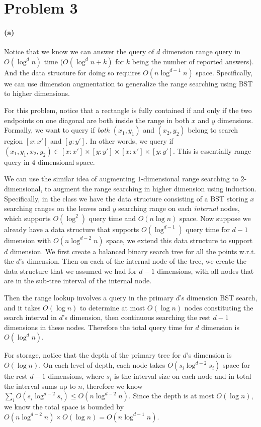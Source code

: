 \documentclass[12pt]{article}
\begin{document}
\pagebreak
\section*{Problem 3}
\paragraph{(a)} Notice that we know we can answer the query of $d$ dimension range query in $O(\log^d n)$ time ($O(\log^d n + k)$ for $k$ being the number of reported answers). And the data structure for doing so requires $O(n \log^{d-1}n)$ space. Specifically, we can use dimension augmentation to generalize the range searching using BST to higher dimensions.  

For this problem, notice that a rectangle is fully contained if and only if the two endpoints on one diagonal are both inside the range in both $x$ and $y$ dimensions. Formally, we want to query if \emph{both} $(x_1, y_1)$ and $(x_2, y_2)$ belong to search region $[x:x']$ and $[y:y']$. In other words, we query if $(x_1, y_1, x_2, y_2) \in [x:x'] \times [y:y'] \times [x:x'] \times [y:y'] $. This is essentially range query in $4$-dimensional space.

We can use the similar idea of augmenting $1$-dimensional range searching to $2$-dimensional, to augment the range searching in higher dimension using induction. Specifically, in the class we have the data structure consisting of a BST storing $x$ searching ranges on the leaves and $y$ searching range on each \emph{internal} nodes, which supports $O(\log^2)$ query time and $O(n\log n)$ space. Now suppose we already have a data structure that supports $O(\log^{d-1})$ query time for $d-1$ dimension with $O(n\log^{d-2} n)$ space, we extend this data structure to support $d$ dimension. We first create a balanced binary search tree for all the points w.r.t. the $d$'s dimension. Then on each of the internal node of the tree, we create the data structure that we assumed we had for $d-1$ dimensions, with all nodes that are in the sub-tree interval of the internal node. 

Then the range lookup involves a query in the primary $d$'s dimension BST search, and it takes $O(\log n)$ to determine at most $O(\log n)$ nodes constituting the search interval in $d$'s dimension, then continuous searching the rest $d-1$ dimensions in these nodes. Therefore the total query time for $d$ dimension is $O(\log^d n)$.

For storage, notice that the depth of the primary tree for $d$'s dimension is $O(\log n)$. On each level of depth, each node takes $O(s_i\log^{d-2} s_i)$ space for the rest $d-1$ dimensions, where $s_i$ is the interval size on each node and in total the interval sums up to $n$, therefore we know $\sum_i O(s_i\log^{d-2} s_i) \leq O(n \log^{d-2}n)$. Since the depth is at most $O(\log n)$, we know the total space is bounded by $O(n \log^{d-2}n) \times O(\log n) = O(n \log^{d-1}n)$.
\end{document}
